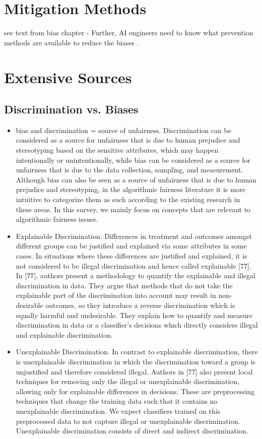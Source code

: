 \documentclass[12pt, a4paper, oneside]{book}   	%
\newif\ifrawcitationactive
\newcommand{\rawcitationstart}{
	\color{purple}\rawcitationactivetrue
}
\begin{document}
			
		\section{Mitigation Methods}
			 see text from bias chapter - Further, \gls{AI} engineers need to know what prevention methods are available to reduce the biases \autocite{Mehrabi_2021}.
			
			
		\section{Extensive Sources}
			
			\rawcitationstart
			\subsection{Discrimination vs. Biases}
			\begin{itemize}
				\item bias and discrimination = source of unfairness. Discrimination can be considered as a source for unfairness that is due to human prejudice and stereotyping based on the sensitive attributes, which may happen intentionally or unintentionally, while bias can be considered as a source for unfairness that is due to the data collection, sampling, and measurement. Although bias can also be seen as a source of unfairness that is due to human prejudice and stereotyping, in the algorithmic fairness literature it is more intuitive to categorize them as such according to the existing research in these areas. In this survey, we mainly focus on concepts that are relevant to algorithmic fairness issues. \autocite{Mehrabi_2021}
				\item Explainable Discrimination. Differences in treatment and outcomes amongst different groups can be justified and explained via some attributes in some cases. In situations where these differences are justified and explained, it is not considered to be illegal discrimination and hence called explainable [77]. In [77], authors present a methodology to quantify the explainable and illegal discrimination in data. They argue that methods that do not take the explainable part of the discrimination into account may result in non-desirable outcomes, so they introduce a reverse discrimination which is equally harmful and undesirable. They explain how to quantify and measure discrimination in data or a classifier’s decisions which directly considers illegal and explainable discrimination.\autocite{Mehrabi_2021}
				\item Unexplainable Discrimination. In contrast to explainable discrimination, there is unexplainable discrimination in which the discrimination toward a group is unjustified and therefore considered illegal. Authors in [77] also present local techniques for removing only the illegal or unexplainable discrimination, allowing only for explainable differences in decisions. These are preprocessing techniques that change the training data such that it contains no unexplainable discrimination. We expect classifiers trained on this preprocessed data to not capture illegal or unexplainable discrimination. Unexplainable discrimination consists of direct and indirect discrimination.\autocite{Mehrabi_2021}

\end{itemize}
\end{document}
